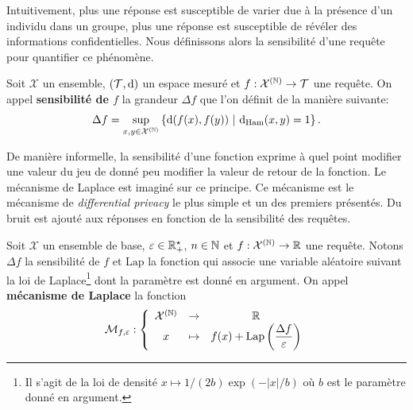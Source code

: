 Intuitivement, plus une réponse est susceptible de varier due à la présence d'un individu dans un groupe, plus une réponse est susceptible de révéler des informations confidentielles. Nous définissons alors la sensibilité d'une requête pour quantifier ce phénomène.

\begin{definition}
    Soit \(\mathcal X\) un ensemble, \((\mathcal T, \mathrm{d})\) un espace mesuré et \(f : \mathcal X^{(\mathbb{N})} \to \mathcal T\) une requête. On appel \textbf{sensibilité de \(f\)} la grandeur \(\Delta f\) que l'on définit de la manière suivante:
    \[
        \Delta f = \underset{x, y \in \mathcal X^{(\mathbb{N})}}{\sup} \left\{ \mathrm{d}(f(x), f(y)) \ | \ \mathrm{d}_{\text{Ham}}(x,y) = 1 \right\}. 
    \]
\end{definition}

De manière informelle, la sensibilité d'une fonction exprime à quel point modifier une valeur du jeu de donné peu modifier la valeur de retour de la fonction. Le mécanisme de {\sc Laplace} \cite{dwork2014the} est imaginé sur ce principe. Ce mécanisme est le mécanisme de \textit{differential privacy} le plus simple et un des premiers présentés. Du bruit est ajouté aux réponses en fonction de la sensibilité des requêtes.\\

\begin{definition}
    Soit \(\mathcal X\) un ensemble de base, \(\varepsilon \in \mathbb{R}_+^\star\), \(n \in \mathbb{N}\) et \(f : \mathcal X^{(\mathbb{N})} \to \mathbb{R}\) une requête. Notons \(\Delta f\) la sensibilité de \(f\) et \(\text{Lap}\) la fonction qui associe une variable aléatoire suivant la loi de {\sc Laplace}\footnote{Il s'agit de la loi de densité \(x \mapsto 1/(2b) \exp(-|x|/b)\) où \(b\) est le paramètre donné en argument.} dont la paramètre est donné en argument. On appel \textbf{mécanisme de {\sc Laplace}} la fonction 
    \[
        \mathcal M_{f,\varepsilon} : \left\{ 
            \begin{array}{ccc}
                \mathcal X^{(\mathbb{N})} & \to & \mathbb{R}\\
                x & \mapsto & f(x) + \text{Lap}\left( \dfrac{\Delta f}{\varepsilon} \right)
            \end{array}
        \right.    
    \]
\end{definition}

